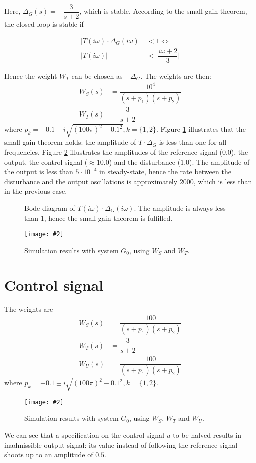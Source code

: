 \documentclass[a4paper,12pt,oneside,onecolumn]{article} %
\newcommand{\imageg}[3][width=1.0\columnwidth]{
	\begin{figure}[H]
		\centering
	    \texttt{[image: \#2]}
		\caption{#3}
		\label{fig:#2}
	\end{figure}
}
\newcommand{\imaget}[3][width=1.0\columnwidth]{
	\begin{figure}[H]
		\centering
      
		\caption{#3}
		\label{fig:#2}
	\end{figure}
}
\begin{document}
  Here, $\Delta_G(s) = -\dfrac{3}{s+2}$, which is stable. According to the small
  gain theorem, the closed loop is stable if

  \begin{align*}
    |T(i\omega)\cdot\Delta_G(i\omega)| &< 1 \Leftrightarrow  \\
    |T(i\omega)| &< \Big|\dfrac{i\omega+2}{3}\Big|
  \end{align*}

  Hence the weight $W_T$ can be chosen as $-\Delta_G$. The weights are then:
	\begin{align*}
    W_S(s) &= \dfrac{10^4}{(s+p_1)(s+p_2)} \\
    W_T(s) &= \dfrac{3}{s+2}
	\end{align*}
  where $p_k = -0.1 \pm i\sqrt{(100\pi)^2 - 0.1^2}, k = \{1,2\}$.  Figure
  \ref{fig:figures/small_gain_2.tex} illustrates that the small gain theorem
  holds: the amplitude of $T\cdot\Delta_G$ is less than one for all frequencies.
  Figure \ref{fig:figures/macro_2.pdf} illustrates the amplitudes of the
  reference signal ($0.0$), the output, the control signal ($\approx10.0$) and
  the disturbance ($1.0$). The amplitude of the output is less than
  $5\cdot10^{-4}$ in steady-state, hence the rate between the disturbance and
  the output oscillations is approximately $2000$, which is less than in the
  previous case.


  \imaget{figures/small_gain_2.tex}{Bode diagram of $T(i\omega)\cdot\Delta_G(i\omega)$. The
    amplitude is always less than 1, hence the small gain theorem is fulfilled.}

	\imageg{figures/macro_2.pdf}{Simulation results with system $G_0$, using $W_S$ and $W_T$.}

  \newpage

	\section*{Control signal}

	The weights are
	\begin{align*}
    W_S(s) &= \dfrac{100}{(s+p_1)(s+p_2)} \\
    W_T(s) &= \dfrac{3}{s+2}              \\
		W_U(s) &= \dfrac{100}{(s+p_1)(s+p_2)}
	\end{align*}
  where $p_k = -0.1 \pm i\sqrt{(100\pi)^2 - 0.1^2}, k = \{1,2\}$.

	\imageg{figures/macro_3.pdf}{Simulation results with system $G_0$, using $W_S$, $W_T$ and $W_U$.}

  We can see that a specification on the control signal $u$ to be halved results
  in inadmissible output signal: its value instead of following the reference
  signal shoots up to an amplitude of $0.5$.
\end{document}

